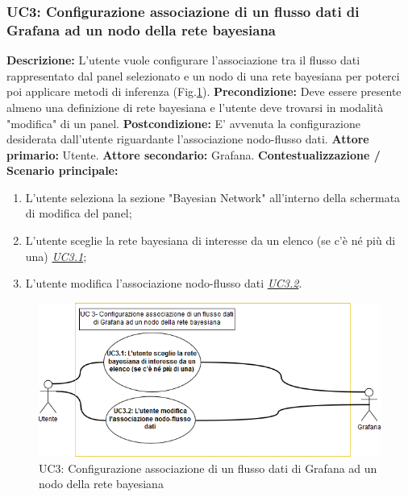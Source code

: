     
                        
                \subsubsection{UC3: Configurazione associazione di un flusso dati di Grafana ad un nodo della rete bayesiana}
                    \textbf{Descrizione:} L’utente vuole configurare l'associazione tra il flusso dati rappresentato dal panel selezionato e un nodo di una rete bayesiana per poterci poi applicare metodi di inferenza (Fig.\ref{uc3}).
                    \newline
                    \textbf{Precondizione:} Deve essere presente almeno una definizione di rete bayesiana e l'utente deve trovarsi in modalità "modifica" di un panel.
                    \newline
                    \textbf{Postcondizione:} E' avvenuta la configurazione desiderata dall'utente riguardante l'associazione nodo-flusso dati.
                    \newline
                    \textbf{Attore primario:} Utente.
                    \newline
                    \textbf{Attore secondario:} Grafana.
                    \newline
                    \textbf{Contestualizzazione / Scenario principale:} \begin{enumerate}
                        \item L’utente seleziona la sezione "Bayesian Network" all'interno della schermata di modifica del panel;
                        \item L'utente sceglie la rete bayesiana di interesse da un elenco (se c'è né più di una) \underline{\textit{UC3.1}};
                        \item L'utente modifica l'associazione nodo-flusso dati \underline{\textit{UC3.2}}.
                    \end{enumerate}
                    
                    \begin{figure}[!htbp]
                    	\centering
                    	\includegraphics[width=\textwidth]{UC3.png}
                    	\caption{UC3: Configurazione associazione di un flusso dati di Grafana ad un nodo della rete bayesiana}
                    	\label{uc3}
                    \end{figure}
                    
